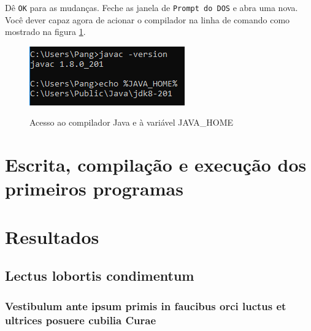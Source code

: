 \documentclass[
	12pt,				%
	openright,			%
	twoside,			%
	a4paper,			%
	english,			%
	french,				%
	spanish,			%
	brazil				%
	]{abntex2}
\begin{document}
Dê \texttt{OK} para as mudanças. Feche as janela de \texttt{Prompt do DOS} e abra uma nova. Você dever capaz agora de acionar o compilador na linha de comando como mostrado na figura \ref{test-vars}.

\begin{figure}[h]
\begin{center}
\includegraphics[scale=0.5]{test-vars.png} 
\caption{Acesso ao compilador Java e à variável JAVA\_HOME}
\label{test-vars}
\end{center}
\end{figure}

\part{Escrita, compilação e execução dos primeiros programas}



\part{Resultados}

\chapter{Lectus lobortis condimentum}

\section{Vestibulum ante ipsum primis in faucibus orci luctus et ultrices
posuere cubilia Curae}

\end{document}
